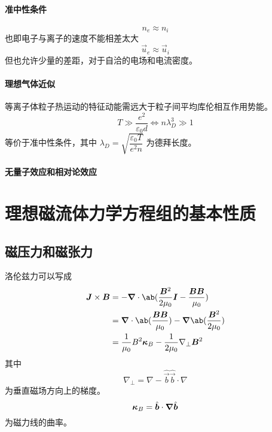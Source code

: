 \paragraph{准中性条件}
\begin{equation}
    n_e \approx n_i
\end{equation}
也即电子与离子的速度不能相差太大
\begin{equation}
    \vec{u}_e \approx \vec{u}_i
\end{equation}
但也允许少量的差距，对于自洽的电场和电流密度。

\paragraph{理想气体近似}
等离子体粒子热运动的特征动能需远大于粒子间平均库伦相互作用势能。
\begin{equation}
    T \gg \frac{e^2}{\varepsilon_0 d}
    \iff n \lambda_D^3 \gg 1
\end{equation}
等价于准中性条件，其中 $\lambda_D = \sqrt{\dfrac{\varepsilon_0 T}{e^2 n}}$ 为德拜长度。

\paragraph{无量子效应和相对论效应}

\section{理想磁流体力学方程组的基本性质}

\subsection{磁压力和磁张力}

洛伦兹力可以写成
\begin{equation}\begin{aligned}
    \vec{J} \times \vec{B} &= - \dive{\ab(
    \frac{\vec{B}^2}{2 \mu_0} \vec{I} - \frac{\vec{B}\vec{B}}{\mu_0}
)} \\
&= \dive{\ab(\frac{\vec{B}\vec{B}}{\mu_0})}
- \grad{\ab(\frac{\vec{B}^2}{2 \mu_0})} \\
&= \frac{1}{\mu_0} B^2 \vec{\kappa}_B
- \frac{1}{2 \mu_0} \nabla_\perp \vec{B}^2
\end{aligned}\end{equation}
其中
\begin{equation}
\nabla_\perp = \nabla - \hat{\vec{b}} \hat{\vec{b}} \cdot \nabla
\end{equation}
为垂直磁场方向上的梯度。
\begin{equation}
\bm{\kappa}_B = \hat{\bm{b}} \cdot \bm{\nabla}{\hat{\bm{b}}}
\end{equation}
为磁力线的曲率。

